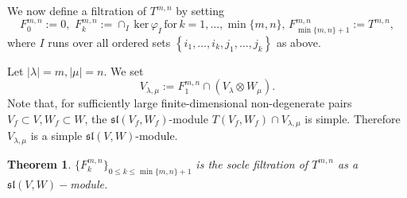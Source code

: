 \documentclass{svmult}
\newtheorem{theo}{Theorem}[section]
\renewcommand{\sl}{\mathfrak{sl}}
\begin{document}
We now define a filtration of $T^{m,n}$ by setting
\begin{equation}\label{gen_soc}
F^{m,n}_0:=0,\,\,F^{m,n}_k:= \cap_I\, \mathrm{ker}\, \varphi_I\,\text{for}\,k=1,\dots,\min\lbrace m,n\rbrace,\,F^{m,n}_{\min \lbrace m,n\rbrace + 1}:=T^{m,n}, 
\end{equation}
where $I$ runs over all ordered sets 
$\left\lbrace i_1,\dots,i_{k},j_1,\dots,j_{k}\right\rbrace$ as above.

Let $|\lambda|=m,|\mu|=n$. We set
$$V_{\lambda,\mu}:=F^{m,n}_1\cap  (V_{\lambda} \otimes W_{\mu}).$$ 
Note that, for sufficiently large finite-dimensional non-degenerate pairs $V_f\subset V, W_f\subset W$, the $\sl(V_f,W_f)$-module $T(V_f,W_f)\cap V_{\lambda,\mu}$ is simple.
Therefore $V_{\lambda,\mu}$ is a simple $\sl(V,W)$-module.

\begin{theo}\label{soc-sl} $\lbrace F^{m,n}_k\rbrace_{0\leq k\leq \min\lbrace m,n\rbrace+1}$ is the socle filtration of $T^{m,n}$ as a $\sl(V,W)-$module.
\end{theo}
\end{document}
